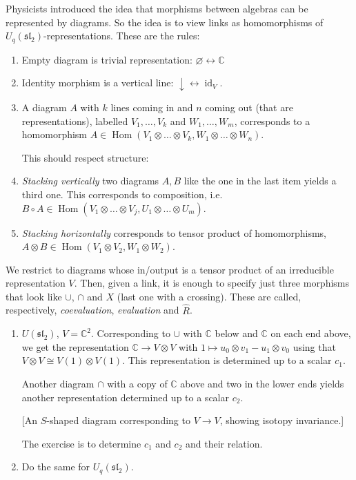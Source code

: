 Physicists introduced the idea that
morphisms between algebras can be
represented by diagrams. So the idea is to
view links as homomorphisms of
$U_{q}(\mathfrak{sl}_{2})$-representations.
These are the rules:
\begin{enumerate}
\item Empty diagram is trivial
representation: $\varnothing
\longleftrightarrow\mathbb{C}$
\item Identity morphism is a vertical
line: $\downarrow\longleftrightarrow
\operatorname{id}_{V}$.
\item A diagram $A$ with $k$ lines coming
in and $n$ coming out (that are
representations), labelled
$V_{1},\ldots,V_{k}$ and
$W_{1},\ldots,W_{m}$, corresponds to a
homomorphism $A \in \operatorname{Hom}
(V_{1}\otimes \ldots\otimes V_{k},
W_{1}\otimes \ldots\otimes W_{n})$.

This should respect structure:
\item {\it Stacking vertically} two
diagrams $A,B$ like the one in the last
item yields a third one. This corresponds
to composition, i.e.
$B\circ A \in \operatorname{Hom}
(V_{1}\otimes \ldots\otimes V_{j},
U_{1}\otimes \ldots\otimes U_{m})$.
\item {\it Stacking horizontally}
corresponds to tensor product of
homomorphisms,
$A\otimes B \in \operatorname{Hom}
(V_{1}\otimes V_{2},W_{1}\otimes W_{2})$.
\end{enumerate}

We restrict to diagrams whose in/output
is a tensor product of an irreducible
representation $V$. Then, given a link, it
is enough to specify just three morphisms
that look like $\cup$, $\cap$ and $X$
(last one with a crossing). These are
called, respectively, {\it coevaluation},
{\it evaluation} and $\hat{R}$.

\begin{exercise}
\label{exercise-l3-cup-cap}
\begin{enumerate}
\item $U(\mathfrak{sl}_{2})$,
$V=\mathbb{C}^{2}$. Corresponding to
$\cup$ with $\mathbb{C}$ below and
$\mathbb{C}$ on each end above, we get the
representation $\mathbb{C}\to V\otimes V$
with $1\mapsto u_{0}\otimes v_{1}-
u_{1}\otimes v_{0}$ using that
$V\otimes V\cong V(1)\otimes V(1)$. This
representation is determined up to a
scalar $c_{1}$.

Another diagram $\cap$ with a copy of
$\mathbb{C}$ above and two in the lower
ends yields another representation
determined up to a scalar $c_{2}$.

[An $S$-shaped diagram corresponding to
$V\to V$, showing isotopy invariance.]

The exercise is to determine $c_{1}$ and
$c_{2}$ and their relation.

\item Do the same for
$U_{q}(\mathfrak{sl}_{2})$.
\end{enumerate}
\end{exercise}

